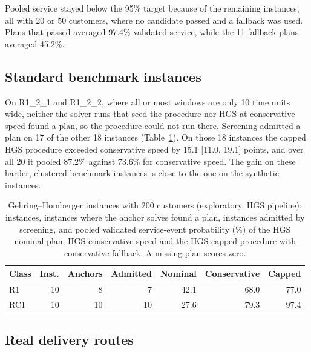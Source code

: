 \documentclass[12pt,letterpaper]{article}
\newcommand{\CappedSelectedMean}{97.4}
\newcommand{\CappedFallbackMean}{45.2}
\newcommand{\CappedFallbackCount}{11}
\newcommand{\GhAdmitted}{17}
\newcommand{\GhAttempted}{18}
\newcommand{\GhDiff}{15.1}
\newcommand{\GhDiffLo}{11.0}
\newcommand{\GhDiffHi}{19.1}
\newcommand{\GhCapped}{87.2}
\newcommand{\GhCons}{73.6}
\begin{document}
Pooled service stayed below the 95\% target because of the remaining instances,
all with 20 or 50 customers, where no candidate passed and a fallback was used.
Plans that passed averaged \CappedSelectedMean\% validated service, while the
\CappedFallbackCount{} fallback plans averaged \CappedFallbackMean\%.

\subsection{Standard benchmark instances}

On R1\_2\_1 and R1\_2\_2, where all or most windows are only 10 time units wide,
neither the solver runs that seed the procedure nor HGS at conservative speed found a
plan, so the procedure could not run there. Screening admitted a plan on
\GhAdmitted{} of the other \GhAttempted{} instances (Table~\ref{tab:gh}). On those
\GhAttempted{} instances the capped HGS procedure exceeded conservative speed by
\GhDiff{} [\GhDiffLo, \GhDiffHi] points, and over all 20 it pooled \GhCapped\%
against \GhCons\% for conservative speed. The gain on these harder, clustered
benchmark instances is close to the one on the synthetic instances.

\begin{table}[t]
\centering
\footnotesize
\setlength{\tabcolsep}{4pt}
\caption{Gehring--Homberger instances with 200 customers (exploratory, HGS pipeline): instances, instances where the anchor solves found a plan, instances admitted by screening, and pooled validated service-event probability (\%) of the HGS nominal plan, HGS conservative speed and the HGS capped procedure with conservative fallback. A missing plan scores zero.}
\label{tab:gh}
\begin{tabular}{@{}lrrrrrr@{}}
\toprule
Class & Inst. & Anchors & Admitted & Nominal & Conservative & Capped\\
\midrule
R1 & 10 & 8 & 7 & 42.1 & 68.0 & 77.0\\
RC1 & 10 & 10 & 10 & 27.6 & 79.3 & 97.4\\
\bottomrule
\end{tabular}
\end{table}

\subsection{Real delivery routes}
\end{document}
